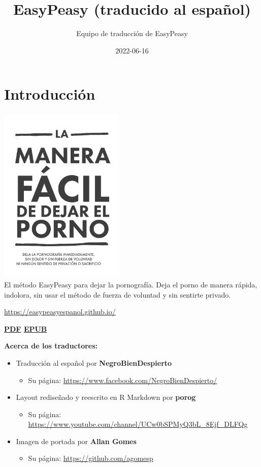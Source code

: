 \documentclass[
  spanish,
  openany]{book}
\title{EasyPeasy (traducido al español)}
\author{Equipo de traducción de EasyPeasy}
\date{2022-06-16}
\providecommand{\tightlist}{%
  \setlength{\itemsep}{0pt}\setlength{\parskip}{0pt}}
\let\oldurl\url
\renewcommand\url{\renewcommand\UrlFont{\ttfamily\color{blue}}\oldurl}
\let\oldhref\href
\renewcommand{\href}[2]{\textcolor{blue}{\oldhref{#1}{#2}}}
\begin{document}
\maketitle

{
\setcounter{tocdepth}{1}
\tableofcontents
}
\hypertarget{introduccion}{%
\chapter{Introducción}\label{introduccion}}

\includegraphics[width=0.45\textwidth,height=0.45\textheight]{img-cover.png}\\

El método EasyPeasy para dejar la pornografía. Deja el porno de manera rápida, indolora, sin usar el método de fuerza de voluntad y sin sentirte privado.

\url{https://easypeasyespanol.github.io/}

{\textbf{\href{https://easypeasyespanol.github.io/easypeasyespanol.pdf}{PDF} \textbar{} \href{https://easypeasyespanol.github.io/easypeasyespanol.epub}{EPUB}}}

\textbf{Acerca de los traductores:}

\begin{itemize}
\tightlist
\item
  Traducción al español por \textbf{NegroBienDespierto}

  \begin{itemize}
  \tightlist
  \item
    Su página: \url{https://www.facebook.com/NegroBienDespierto/}
  \end{itemize}
\item
  Layout rediseñado y reescrito en R Markdown por \textbf{porog}

  \begin{itemize}
  \tightlist
  \item
    Su página: \url{https://www.youtube.com/channel/UCw0bSPMyQ3bL_8Ejf_DLFQg}
  \end{itemize}
\item
  Imagen de portada por \textbf{Allan Gomes}

  \begin{itemize}
  \tightlist
  \item
    Su página: \url{https://github.com/agomesp}
  \end{itemize}
\end{itemize}
\end{document}
